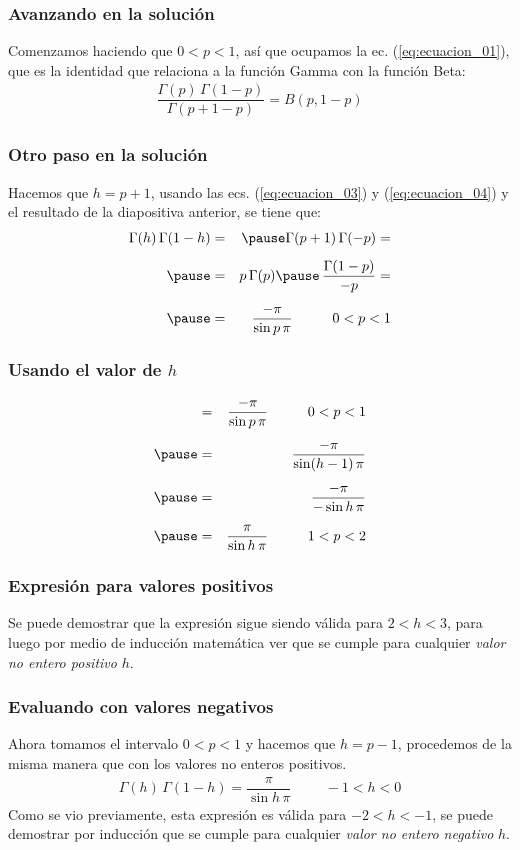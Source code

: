\documentclass[12pt]{beamer}
\begin{document}
\begin{frame}
\frametitle{Avanzando en la solución}
Comenzamos haciendo que $0 < p < 1$, así que ocupamos la ec. (\ref{eq:ecuacion_01}), que es la identidad que relaciona a la función Gamma con la función Beta:
\pause
\begin{align*}
\dfrac{\Gamma(p) \, \Gamma(1 - p)}{\Gamma(p + 1 - p)} = B(p, 1 - p) 
\end{align*}
\end{frame}
\begin{frame}
\frametitle{Otro paso en la solución}
Hacemos que $h = p + 1$, usando las ecs. (\ref{eq:ecuacion_03}) y (\ref{eq:ecuacion_04}) y el resultado de la diapositiva anterior, se tiene que:
\begin{eqnarray*}
\Gamma(h) \, \Gamma(1 - h) &=& \pause \Gamma(p + 1) \, \Gamma(-p) = \\[0.5em] \pause
&=& p \, \Gamma(p) \pause \, \dfrac{\Gamma(1 - p)}{- p} = \\[0.5em] \pause
&=& \dfrac{-\pi}{\sin p \, \pi} \hspace{1cm} 0 < p < 1
\end{eqnarray*}
\end{frame}
\begin{frame}
\frametitle{Usando el valor de $h$}
\begin{eqnarray*}
&=& \dfrac{-\pi}{\sin p \, \pi} \hspace{1cm} 0 < p < 1 \\[0.5em] \pause
&=& \dfrac{-\pi}{\sin (h - 1) \, \pi} \\[0.5em] \pause
&=& \dfrac{-\pi}{- \sin h \, \pi} \\[0.5em] \pause
&=& \dfrac{\pi}{\sin h \, \pi} \hspace{1cm} 1 < p < 2
\end{eqnarray*}
\end{frame}
\begin{frame}
\frametitle{Expresión para valores positivos}
Se puede demostrar que la expresión sigue siendo válida para $2 < h < 3$, para luego por medio de inducción matemática ver que se cumple para cualquier \emph{valor no entero positivo} $h$.
\end{frame}
\begin{frame}
\frametitle{Evaluando con valores negativos}
Ahora tomamos el intervalo $0 < p < 1$ y hacemos que $h = p - 1$, \pause procedemos de la misma manera que con los valores no enteros positivos.
\pause
\begin{align*}
\Gamma(h) \, \Gamma(1 - h) = \dfrac{\pi}{\sin h \, \pi} \hspace{1cm} -1 < h < 0
\end{align*}
\pause
Como se vio previamente, esta expresión es válida para $-2 < h < -1$, \pause se puede demostrar por inducción que se cumple para cualquier \emph{valor no entero negativo} $h$.
\end{frame}
\end{document}
